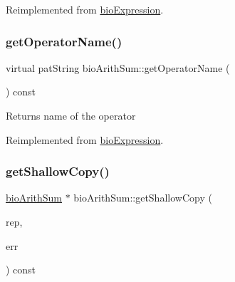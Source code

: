 Reimplemented from \hyperlink{classbio_expression_a2353a4afb3a2b0af7c63aba086a72bde}{bio\+Expression}.

\mbox{\label{classbio_arith_sum_a9e0ab0b9062a7cd80e70fc16505bc282}} 
\subsubsection{\texorpdfstring{get\+Operator\+Name()}{getOperatorName()}\hspace{0.1cm}{\footnotesize\ttfamily [4/4]}}
{\footnotesize\ttfamily virtual pat\+String bio\+Arith\+Sum\+::get\+Operator\+Name (\begin{DoxyParamCaption}{ }\end{DoxyParamCaption}) const\hspace{0.3cm}{\ttfamily [virtual]}}

\begin{DoxyReturn}{Returns}
name of the operator 
\end{DoxyReturn}


Reimplemented from \hyperlink{classbio_expression_a2353a4afb3a2b0af7c63aba086a72bde}{bio\+Expression}.

\mbox{\label{classbio_arith_sum_ac2180e097ac045f893a789dd627b259a}} 
\subsubsection{\texorpdfstring{get\+Shallow\+Copy()}{getShallowCopy()}\hspace{0.1cm}{\footnotesize\ttfamily [1/4]}}
{\footnotesize\ttfamily \hyperlink{classbio_arith_sum}{bio\+Arith\+Sum} $\ast$ bio\+Arith\+Sum\+::get\+Shallow\+Copy (\begin{DoxyParamCaption}\item[{\hyperlink{classbio_expression_repository}{bio\+Expression\+Repository} $\ast$}]{rep,  }\item[{pat\+Error $\ast$\&}]{err }\end{DoxyParamCaption}) const\hspace{0.3cm}{\ttfamily [virtual]}}

